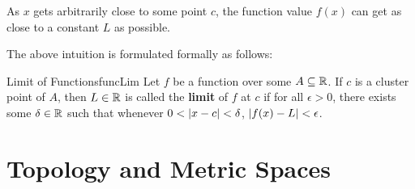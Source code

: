 \documentclass[math]{amznotes}
\theoremstyle{remark}
\begin{document}
As $x$ gets arbitrarily close to some point $c$, the function value $f(x)$ can get as close to a constant $L$ as possible.

The above intuition is formulated formally as follows:
\begin{dfnbox}{Limit of Functions}{funcLim}
    Let $f$ be a function over some $A \subseteq \mathbb{R}$. If $c$ is a cluster point of $A$, then $L \in \mathbb{R}$ is called the {\color{red} \textbf{limit}} of $f$ at $c$ if for all $\epsilon > 0$, there exists some $\delta \in \mathbb{R}$ such that whenever $0 < {\left\lvert {x - c} \right\rvert} < \delta$, ${\left\lvert {f(x) - L} \right\rvert} < \epsilon$. 
\end{dfnbox}

\chapter{Topology and Metric Spaces}
\end{document}
